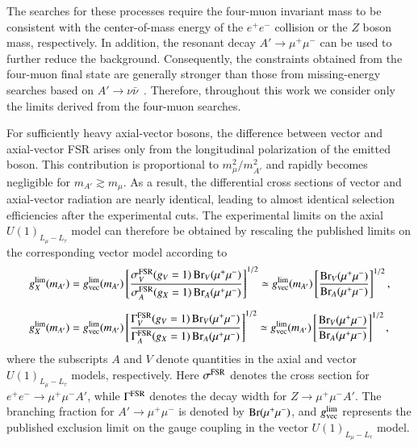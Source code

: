 \documentclass[onecolumn, aps, nofootinbib, prd, preprint, floats, floatfix, amsmath, amssymb, superscriptaddress, preprintnumbers]{revtex4-2}
\begin{document}
The searches for these processes require the four-muon invariant mass to be consistent with the center-of-mass energy of the $e^+e^-$ collision or the $Z$ boson mass, respectively. In addition, the resonant decay $A'\to\mu^+\mu^-$ can be used to further reduce the background. Consequently, the constraints obtained from the four-muon final state are generally stronger than those from missing-energy searches based on $A'\rightarrow\nu\bar{\nu}$~\cite{Belle-II:2022yaw}. Therefore, throughout this work we consider only the limits derived from the four-muon searches.

For sufficiently heavy axial-vector bosons, the difference between vector and axial-vector FSR arises only from the longitudinal polarization of the emitted boson. This contribution is proportional to $m_\mu^2/m_{A'}^2$ and rapidly becomes negligible for $m_{A'}\gtrsim m_\mu$. As a result, the differential cross sections of vector and axial-vector radiation are nearly identical, leading to almost identical selection efficiencies after the experimental cuts. The experimental limits on the axial $U(1)_{L_\mu-L_\tau}$ model can therefore be obtained by rescaling the published limits on the corresponding vector model according to
\begin{equation}
	\begin{aligned}
		g_X^{\rm lim}(m_{A'})
		&=
		g_{\rm vec}^{\rm lim}(m_{A'})
		\left[
		\frac{\sigma_V^{\rm FSR}(g_V=1)\,
			{\rm Br}_V(\mu^+\mu^-)}
		{\sigma_A^{\rm FSR}(g_X=1)\,
			{\rm Br}_A(\mu^+\mu^-)}
		\right]^{1/2}
		\simeq
		g_{\rm vec}^{\rm lim}(m_{A'})
		\left[
		\frac{{\rm Br}_V(\mu^+\mu^-)}
		{{\rm Br}_A(\mu^+\mu^-)}
		\right]^{1/2},
		\\[2mm]
		g_X^{\rm lim}(m_{A'})
		&=
		g_{\rm vec}^{\rm lim}(m_{A'})
		\left[
		\frac{\Gamma_V^{\rm FSR}(g_V=1)\,
			{\rm Br}_V(\mu^+\mu^-)}
		{\Gamma_A^{\rm FSR}(g_X=1)\,
			{\rm Br}_A(\mu^+\mu^-)}
		\right]^{1/2}
		\simeq
		g_{\rm vec}^{\rm lim}(m_{A'})
		\left[
		\frac{{\rm Br}_V(\mu^+\mu^-)}
		{{\rm Br}_A(\mu^+\mu^-)}
		\right]^{1/2},
	\end{aligned}
	\label{eq:four-muon-rescale}
\end{equation}
where the subscripts $A$ and $V$ denote quantities in the axial and vector $U(1)_{L_\mu-L_\tau}$ models, respectively. Here $\sigma^{\rm FSR}$ denotes the cross section for $e^+e^-\rightarrow\mu^+\mu^-A'$, while $\Gamma^{\rm FSR}$ denotes the decay width for $Z\rightarrow\mu^+\mu^-A'$. The branching fraction for $A'\rightarrow\mu^+\mu^-$ is denoted by ${\rm Br}(\mu^+\mu^-)$, and $g_{\rm vec}^{\rm lim}$ represents the published exclusion limit on the gauge coupling in the vector $U(1)_{L_\mu-L_\tau}$ model.
\end{document}
